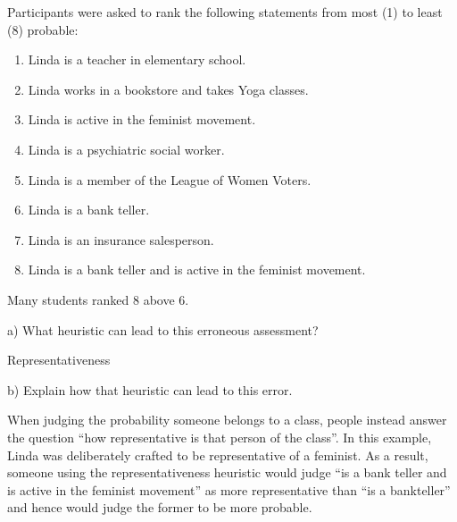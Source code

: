 \documentclass[
  letterpaper,
  DIV=11,
  numbers=noendperiod]{scrreprt}
\providecommand{\tightlist}{%
  \setlength{\itemsep}{0pt}\setlength{\parskip}{0pt}}\usepackage{longtable,booktabs,array}
\begin{document}
Participants were asked to rank the following statements from most (1)
to least (8) probable:

\begin{enumerate}
\def\labelenumi{\arabic{enumi}.}
\tightlist
\item
  Linda is a teacher in elementary school.
\item
  Linda works in a bookstore and takes Yoga classes.
\item
  Linda is active in the feminist movement.
\item
  Linda is a psychiatric social worker.
\item
  Linda is a member of the League of Women Voters.
\item
  Linda is a bank teller.
\item
  Linda is an insurance salesperson.
\item
  Linda is a bank teller and is active in the feminist movement.
\end{enumerate}

Many students ranked 8 above 6.

a) What heuristic can lead to this erroneous assessment?

\begin{tcolorbox}[enhanced jigsaw, title=\textcolor{quarto-callout-tip-color}{\faLightbulb}\hspace{0.5em}{Answer}, toprule=.15mm, colback=white, breakable, titlerule=0mm, colframe=quarto-callout-tip-color-frame, coltitle=black, opacityback=0, rightrule=.15mm, colbacktitle=quarto-callout-tip-color!10!white, bottomtitle=1mm, opacitybacktitle=0.6, arc=.35mm, bottomrule=.15mm, toptitle=1mm, leftrule=.75mm, left=2mm]

Representativeness

\end{tcolorbox}

b) Explain how that heuristic can lead to this error.

\begin{tcolorbox}[enhanced jigsaw, title=\textcolor{quarto-callout-tip-color}{\faLightbulb}\hspace{0.5em}{Answer}, toprule=.15mm, colback=white, breakable, titlerule=0mm, colframe=quarto-callout-tip-color-frame, coltitle=black, opacityback=0, rightrule=.15mm, colbacktitle=quarto-callout-tip-color!10!white, bottomtitle=1mm, opacitybacktitle=0.6, arc=.35mm, bottomrule=.15mm, toptitle=1mm, leftrule=.75mm, left=2mm]

When judging the probability someone belongs to a class, people instead
answer the question ``how representative is that person of the class''.
In this example, Linda was deliberately crafted to be representative of
a feminist. As a result, someone using the representativeness heuristic
would judge ``is a bank teller and is active in the feminist movement''
as more representative than ``is a bankteller'' and hence would judge
the former to be more probable.

\end{tcolorbox}
\end{document}
